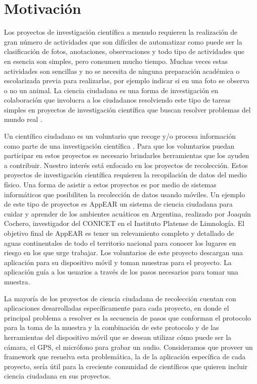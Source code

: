 \section{ Motivación }

Los proyectos de investigación científica a menudo requieren la realización de gran número de actividades que son difíciles de automatizar como puede ser la clasificación de fotos, anotaciones, observaciones y todo tipo de actividades que en esencia son simples, pero consumen mucho tiempo. Muchas veces estas actividades son sencillas y no se necesita de ninguna preparación académica o escolarizada previa para realizarlas, por ejemplo indicar si en una foto se observa o no un animal. La ciencia ciudadana es una forma de investigación en colaboración que involucra a los ciudadanos resolviendo este tipo de tareas simples en proyectos de investigación científica que buscan resolver problemas del mundo real \cite{wiggins2011conservation}. 

Un científico ciudadano es un voluntario que recoge y/o procesa información como parte de una investigación científica \cite{silvertown2009new}. Para que los voluntarios puedan participar en estos proyectos es necesario brindarles herramientas que los ayuden a contribuir. 
Nuestro interés está enfocado en los proyectos de recolección. Estos proyectos de investigación científica requieren la recopilación de datos del medio físico. Una forma de asistir a estos proyectos es por medio de sistemas informáticos que posibiliten la recolección de datos usando móviles. Un ejemplo de este tipo de proyectos es AppEAR un sistema de ciencia ciudadana para cuidar y aprender de los ambientes acuáticos en Argentina, realizado por Joaquín Cochero, investigador del CONICET en el Instituto Platense de Limnología. El objetivo final de AppEAR es tener un relevamiento completo y detallado de aguas continentales de todo el territorio nacional para conocer los lugares en riesgo en los que urge trabajar. Los voluntarios de este proyecto descargan una aplicación para su dispositivo móvil y toman muestras para el proyecto. La aplicación guía a los usuarios a través de los pasos necesarios para tomar una muestra.

La mayoría de los proyectos de ciencia ciudadana de recolección cuentan con aplicaciones desarrolladas específicamente para cada proyecto, en donde el principal problema a resolver es la secuencia de pasos que conforman el protocolo para la toma de la muestra y la combinación de este protocolo y de las herramientas del dispositivo móvil que se desean utilizar cómo puede ser la cámara, el GPS, el micrófono para grabar un audio. Consideramos que proveer un framework que resuelva esta problemática, la de la aplicación específica de cada proyecto, sería útil para la creciente comunidad de científicos que quieren incluir ciencia ciudadana en sus proyectos.

